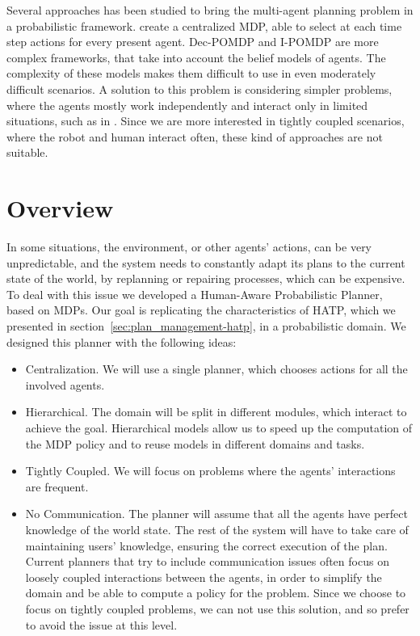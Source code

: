 Several approaches has been studied to bring the multi-agent planning problem in a probabilistic framework. \cite{boutilier1999sequential} create a centralized MDP, able to select at each time step actions for every present agent. Dec-POMDP \citep{bernstein2002complexity} and I-POMDP \citep{gmytrasiewicz2005framework} are more complex frameworks, that take into account the belief models of agents. The complexity of these models makes them difficult to use in even moderately difficult scenarios. A solution to this problem is considering simpler problems, where the agents mostly work independently and interact only in limited situations, such as in \cite{melo2013heuristic}.  Since we are more interested in tightly coupled scenarios, where the robot and human interact often, these kind of approaches are not suitable.

\section{Overview}
\label{sec:mamdp-overview}
In some situations, the environment, or other agents' actions, can be very unpredictable, and the system needs to constantly adapt its plans to the current state of the world, by replanning or repairing processes, which can be expensive. To deal with this issue we developed a Human-Aware Probabilistic Planner, based on MDPs. Our goal is replicating the characteristics of HATP, which we presented in section~\ref{sec:plan_management-hatp}, in a probabilistic domain. We designed this planner with the following ideas:

\begin{itemize}
\item Centralization. We will use a single planner, which chooses actions for all the involved agents.
\item Hierarchical. The domain will be split in different modules, which interact to achieve the goal. Hierarchical models allow us to speed up the computation of the MDP policy and to reuse models in different domains and tasks.
\item Tightly Coupled. We will focus on problems where the agents' interactions are frequent.
\item No Communication. The planner will  assume that all the agents have perfect knowledge of the world state. The rest of the system will have to take care of maintaining users' knowledge, ensuring the correct execution of the plan. Current planners that try to include communication issues often focus on loosely coupled interactions between the agents, in order to simplify the domain and be able to compute a policy for the problem. Since we choose to focus on tightly coupled problems, we can not use this solution, and so prefer to avoid the issue at this level.
\end{itemize}

